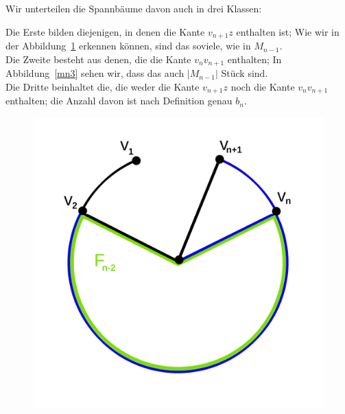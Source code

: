 Wir unterteilen die Spannbäume davon auch in drei Klassen:\\
\par
\begingroup
\leftskip=20pt
\rightskip=20pt
\noindent
Die Erste bilden diejenigen, in denen die Kante $v_{n+1}z$ enthalten ist; Wie wir in der Abbildung~\ref{mn2} erkennen können, sind das soviele, wie in $M_{n-1}$.\\
Die Zweite besteht aus denen, die die Kante $v_nv_{n+1}$ enthalten; In Abbildung~\ref{mn3} sehen wir, dass das auch $|M_{n-1}|$ Stück sind.\\
Die Dritte beinhaltet die, die weder die Kante $v_{n+1}z$ noch die Kante $v_nv_{n+1}$ enthalten; die Anzahl davon ist nach Definition genau $b_{n}$.\\
\par
\endgroup
\begin{figure}[H]
    \centering
    \begin{minipage}{0.45\textwidth}
        \centering
        \includegraphics[width=1\textwidth]{mn2.png}
        \caption{}
 \label{mn2} %
    \end{minipage}\hfill
    \begin{minipage}{0.45\textwidth}
        \centering

\end{minipage}
\end{figure}
